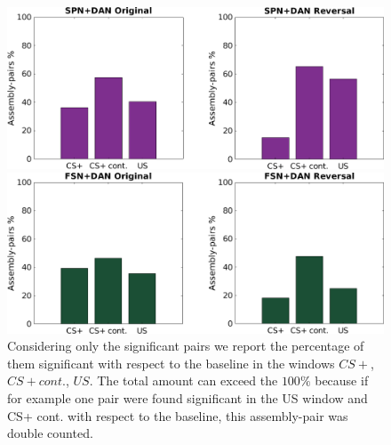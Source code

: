  \begin{figure}
    \centering
    \includegraphics[scale=0.4]{figures/SPN_DANHisto.png}
    
    \vspace{1cm}
    
    \includegraphics[scale=0.4]{figures/FSN_DANHisto.png}
\caption{Considering only the significant pairs we report the percentage of them significant with respect to the baseline in the windows $CS+$, $CS+ cont.$, $US$. The total amount can exceed the $100\%$ because if for example one pair were found significant in the US window and CS+ cont. with respect to the baseline, this assembly-pair was double counted.}
    \label{fig:FriedHistoDAN}
\end{figure}
